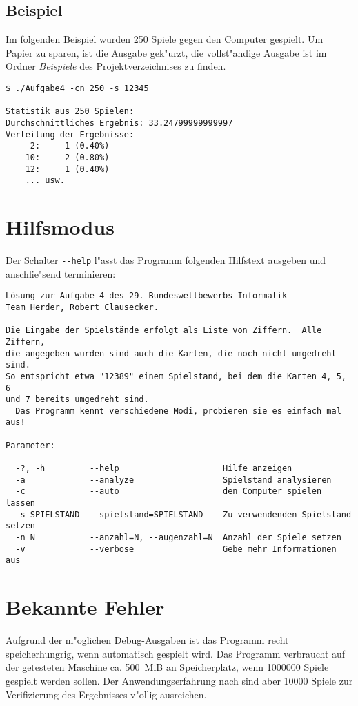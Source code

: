 \documentclass{scrreprt}
\begin{document}
\subsection*{Beispiel}
Im folgenden Beispiel wurden 250 Spiele gegen den Computer gespielt.  Um Papier
zu sparen, ist die Ausgabe gek"urzt, die vollst"andige Ausgabe ist im Ordner
\emph{Beispiele} des Projektverzeichnises zu finden.

\begin{verbatim}
$ ./Aufgabe4 -cn 250 -s 12345

Statistik aus 250 Spielen:
Durchschnittliches Ergebnis: 33.24799999999997
Verteilung der Ergebnisse:
	 2:     1 (0.40%)
	10:     2 (0.80%)
	12:     1 (0.40%)
    ... usw.
\end{verbatim}

\section{Hilfsmodus}
Der Schalter \texttt{-\/-help} l"asst das Programm folgenden Hilfstext ausgeben
und anschlie"send terminieren:

\begin{verbatim}
Lösung zur Aufgabe 4 des 29. Bundeswettbewerbs Informatik
Team Herder, Robert Clausecker.

Die Eingabe der Spielstände erfolgt als Liste von Ziffern.  Alle Ziffern,
die angegeben wurden sind auch die Karten, die noch nicht umgedreht sind.
So entspricht etwa "12389" einem Spielstand, bei dem die Karten 4, 5, 6
und 7 bereits umgedreht sind.
  Das Programm kennt verschiedene Modi, probieren sie es einfach mal aus!

Parameter:

  -?, -h         --help                     Hilfe anzeigen
  -a             --analyze                  Spielstand analysieren
  -c             --auto                     den Computer spielen lassen
  -s SPIELSTAND  --spielstand=SPIELSTAND    Zu verwendenden Spielstand setzen
  -n N           --anzahl=N, --augenzahl=N  Anzahl der Spiele setzen
  -v             --verbose                  Gebe mehr Informationen aus
\end{verbatim}

\section{Bekannte Fehler}
Aufgrund der m"oglichen Debug-Ausgaben ist das Programm recht speicherhungrig,
wenn automatisch gespielt wird.  Das Programm verbraucht auf der getesteten
Maschine ca. 500~MiB an Speicherplatz, wenn 1000000 Spiele gespielt werden
sollen. Der Anwendungserfahrung nach sind aber 10000 Spiele zur Verifizierung
des Ergebnisses v"ollig ausreichen.
\end{document}
